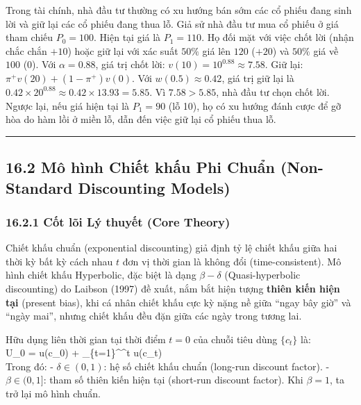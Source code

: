 \documentclass[
]{article}
\begin{document}
Trong tài chính, nhà đầu tư thường có xu hướng bán sớm các cổ phiếu đang
sinh lời và giữ lại các cổ phiếu đang thua lỗ. Giả sử nhà đầu tư mua cổ
phiếu ở giá tham chiếu \(P_0 = 100\). Hiện tại giá là \(P_1 = 110\). Họ
đối mặt với việc chốt lời (nhận chắc chắn \(+10\)) hoặc giữ lại với xác
suất \(50\%\) giá lên \(120\) (\(+20\)) và \(50\%\) giá về \(100\)
(\(0\)). Với \(\alpha = 0.88\), giá trị chốt lời:
\(v(10) = 10^{0.88} \approx 7.58\). Giữ lại:
\(\pi^+ v(20) + (1-\pi^+)v(0)\). Với \(w(0.5) \approx 0.42\), giá trị
giữ lại là \(0.42 \times 20^{0.88} \approx 0.42 \times 13.93 = 5.85\).
Vì \(7.58 > 5.85\), nhà đầu tư chọn chốt lời. Ngược lại, nếu giá hiện
tại là \(P_1 = 90\) (lỗ 10), họ có xu hướng đánh cược để gỡ hòa do hàm
lồi ở miền lỗ, dẫn đến việc giữ lại cổ phiếu thua lỗ.

\begin{center}\rule{0.5\linewidth}{0.5pt}\end{center}

\subsection{16.2 Mô hình Chiết khấu Phi Chuẩn (Non-Standard Discounting
Models)}\label{muxf4-huxecnh-chiux1ebft-khux1ea5u-phi-chuux1ea9n-non-standard-discounting-models}

\subsubsection{16.2.1 Cốt lõi Lý thuyết (Core
Theory)}\label{cux1ed1t-luxf5i-luxfd-thuyux1ebft-core-theory-61}

Chiết khấu chuẩn (exponential discounting) giả định tỷ lệ chiết khấu
giữa hai thời kỳ bất kỳ cách nhau \(t\) đơn vị thời gian là không đổi
(time-consistent). Mô hình chiết khấu Hyperbolic, đặc biệt là dạng
\(\beta-\delta\) (Quasi-hyperbolic discounting) do Laibson (1997) đề
xuất, nắm bắt hiện tượng \textbf{thiên kiến hiện tại} (present bias),
khi cá nhân chiết khấu cực kỳ nặng nề giữa ``ngay bây giờ'' và ``ngày
mai'', nhưng chiết khấu đều đặn giữa các ngày trong tương lai.

Hữu dụng liên thời gian tại thời điểm \(t=0\) của chuỗi tiêu dùng
\(\{c_t\}\) là: \[
\] U\_0 = u(c\_0) + \beta \sum\_\{t=1\}\^{}\infty \delta\^{}t u(c\_t) \[
\] Trong đó: - \(\delta \in (0,1)\): hệ số chiết khấu chuẩn (long-run
discount factor). - \(\beta \in (0,1]\): tham số thiên kiến hiện tại
(short-run discount factor). Khi \(\beta = 1\), ta trở lại mô hình
chuẩn.
\end{document}
